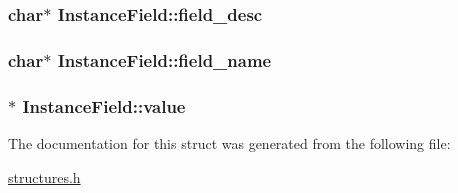 \subsubsection[{\texorpdfstring{field\+\_\+desc}{field_desc}}]{\setlength{\rightskip}{0pt plus 5cm}char$\ast$ Instance\+Field\+::field\+\_\+desc}\hypertarget{structInstanceField_a5ee57ef4ae029c3b3dbb1e619ed0805d}{}\label{structInstanceField_a5ee57ef4ae029c3b3dbb1e619ed0805d}
\subsubsection[{\texorpdfstring{field\+\_\+name}{field_name}}]{\setlength{\rightskip}{0pt plus 5cm}char$\ast$ Instance\+Field\+::field\+\_\+name}\hypertarget{structInstanceField_a75b4828e1175de0f4368c5370d64eb6c}{}\label{structInstanceField_a75b4828e1175de0f4368c5370d64eb6c}
\subsubsection[{\texorpdfstring{value}{value}}]{$\ast$ Instance\+Field\+::value}\hypertarget{structInstanceField_aa37a1889a89600c93ce579a2e466e504}{}\label{structInstanceField_aa37a1889a89600c93ce579a2e466e504}


The documentation for this struct was generated from the following file\+:\begin{DoxyCompactItemize}
\item 
\hyperlink{structures_8h}{structures.\+h}\end{DoxyCompactItemize}
